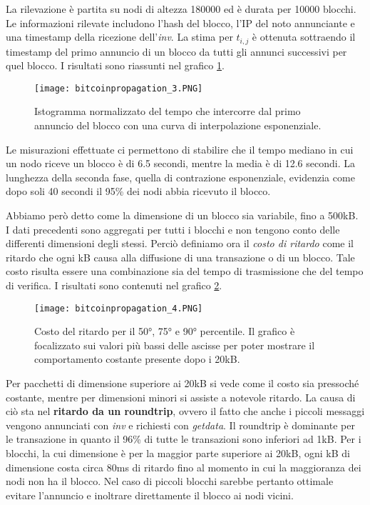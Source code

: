 La rilevazione è partita su nodi di altezza 180000 ed è durata per 10000 blocchi. Le informazioni rilevate includono l'hash del blocco, l'IP del noto annunciante e una timestamp della ricezione dell'\emph{inv}. La stima per $t_{i,j}$ è ottenuta sottraendo il timestamp del primo annuncio di un blocco da tutti gli annunci successivi per quel blocco. I risultati sono riassunti nel grafico \ref{bitcoinpropagation_3}.

\begin{figure}[htbp]
\centering
\texttt{[image: bitcoinpropagation\_3.PNG]}
\caption{Istogramma normalizzato del tempo che intercorre dal primo annuncio del blocco con una curva di interpolazione esponenziale.\label{bitcoinpropagation_3}}
\end{figure}

Le misurazioni effettuate ci permettono di stabilire che il tempo mediano in cui un nodo riceve un blocco è di 6.5 secondi, mentre la media è di 12.6 secondi. La lunghezza della seconda fase, quella di contrazione esponenziale, evidenzia come dopo soli 40 secondi il 95\% dei nodi abbia ricevuto il blocco.

Abbiamo però detto come la dimensione di un blocco sia variabile, fino a 500kB. I dati precedenti sono aggregati per tutti i blocchi e non tengono conto delle differenti dimensioni degli stessi. Perciò definiamo ora il \emph{costo di ritardo} come il ritardo che ogni kB causa alla diffusione di una transazione o di un blocco. Tale costo risulta essere una combinazione sia del tempo di trasmissione che del tempo di verifica. I risultati sono contenuti nel grafico \ref{bitcoinpropagation_4}.

\begin{figure}[htbp]
\centering
\texttt{[image: bitcoinpropagation\_4.PNG]}
\caption{Costo del ritardo per il 50°, 75° e 90° percentile. Il grafico è focalizzato sui valori più bassi delle ascisse per poter mostrare il comportamento costante presente dopo i 20kB.\label{bitcoinpropagation_4}}
\end{figure}

Per pacchetti di dimensione superiore ai 20kB si vede come il costo sia pressoché costante, mentre per dimensioni minori si assiste a notevole ritardo. La causa di ciò sta nel \textbf{ritardo da un roundtrip}, ovvero il fatto che anche i piccoli messaggi vengono annunciati con \emph{inv} e richiesti con \emph{getdata}. Il roundtrip è dominante per le transazione in quanto il 96\% di tutte le transazioni sono inferiori ad 1kB. Per i blocchi, la cui dimensione è per la maggior parte superiore ai 20kB, ogni kB di dimensione costa circa 80ms di ritardo fino al momento in cui la maggioranza dei nodi non ha il blocco. %
Nel caso di piccoli blocchi sarebbe pertanto ottimale evitare l'annuncio e inoltrare direttamente il blocco ai nodi vicini.

